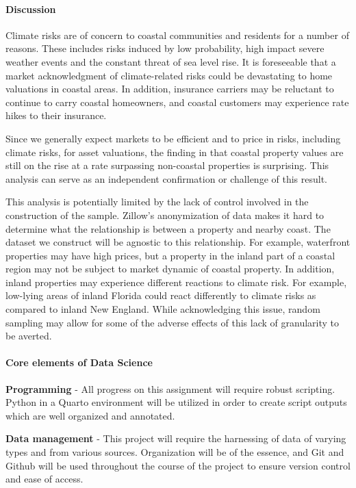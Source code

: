 \documentclass[12pt]{article}
\begin{document}
\paragraph{Discussion}

Climate risks are of concern to coastal communities and residents for a number of reasons. These includes risks induced by low probability, high impact severe weather events and the constant threat of sea level rise. It is foreseeable that a market acknowledgment of climate-related risks could be devastating to home valuations in coastal areas. In addition, insurance carriers may be reluctant to continue to carry coastal homeowners, and coastal customers may experience rate hikes to their insurance. \citep{peterson2024coastal} 

Since we generally expect markets to be efficient and to price in risks, including climate risks, for asset valuations, the finding in \citet{McNamara2024} that coastal property values are still on the rise at a rate surpassing non-coastal properties is surprising. This analysis can serve as an independent confirmation or challenge of this result. 

This analysis is potentially limited by the lack of control involved in the construction of the sample. Zillow's anonymization of data makes it hard to determine what the relationship is between a property and nearby coast. The dataset we construct will be agnostic to this relationship. For example, waterfront properties may have high prices, but a property in the inland part of a coastal region may not be subject to market dynamic of coastal property. In addition, inland properties may experience different reactions to climate risk. For example, low-lying areas of inland Florida could react differently to climate risks as compared to inland New England. While acknowledging this issue, random sampling may allow for some of the adverse effects of this lack of granularity to be averted. 

\paragraph{Core elements of Data Science} \phantom{a} %

\textbf{Programming} - All progress on this assignment will require robust scripting. Python in a Quarto environment will be utilized in order to create script outputs which are well organized and annotated. 

\textbf{Data management} - This project will require the harnessing of data of varying types and from various sources. Organization will be of the essence, and Git and Github will be used throughout the course of the project to ensure version control and ease of access. 
\end{document}
